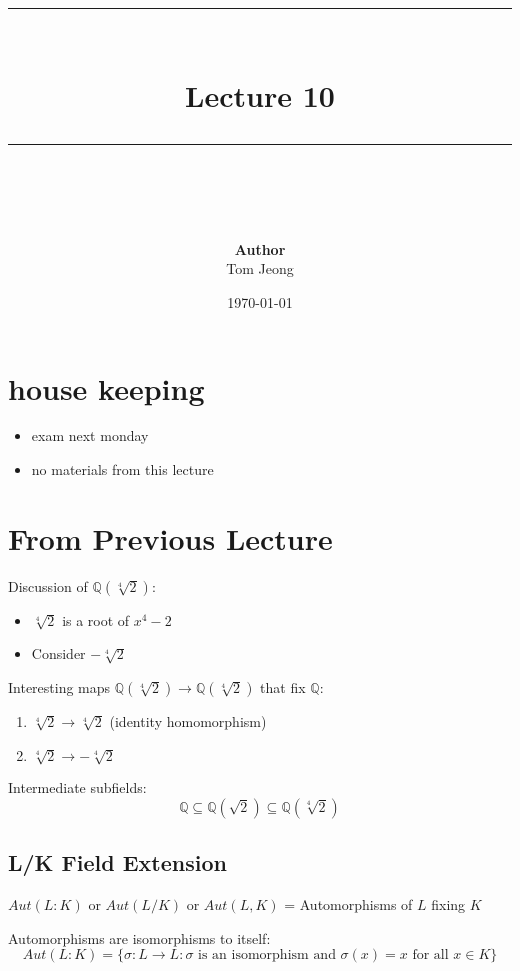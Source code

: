\documentclass{article}
\newcommand{\HRule}[1]{\rule{\linewidth}{#1}}
\begin{document}
\title{
    \normalsize
    \vspace{2.0cm}
    \HRule{1.5pt} \\[0.4cm]
    \LARGE \textbf{Lecture 10}
    \HRule{2.0pt} \\[0.6cm]
}
\author{
    \textbf{Author} \\
    Tom Jeong
}
\date{\today}

\maketitle
\tableofcontents
\newpage

\section{house keeping}
\begin{itemize}
    \item exam next monday
    \item no materials from this lecture
\end{itemize}
\section{From Previous Lecture}
Discussion of $\mathbb{Q}(\sqrt[4]{2})$:
\begin{itemize}
    \item $\sqrt[4]{2}$ is a root of $x^4 - 2$
    \item Consider $-\sqrt[4]{2}$
\end{itemize}

Interesting maps $\mathbb{Q}(\sqrt[4]{2}) \to \mathbb{Q}(\sqrt[4]{2})$ that fix $\mathbb{Q}$:
\begin{enumerate}
    \item $\sqrt[4]{2} \to \sqrt[4]{2}$ (identity homomorphism)
    \item $\sqrt[4]{2} \to -\sqrt[4]{2}$
\end{enumerate}

Intermediate subfields:
$$\mathbb{Q} \subseteq \mathbb{Q}(\sqrt{2}) \subseteq \mathbb{Q}(\sqrt[4]{2})$$

\subsection{L/K Field Extension}
$Aut(L:K)$ or $Aut(L/K)$ or $Aut(L,K)$ = Automorphisms of $L$ fixing $K$

\begin{definition}
    Automorphisms are isomorphisms to itself:
    $$Aut(L:K) = \{\sigma: L \to L: \sigma \text{ is an isomorphism} \text{ and } \sigma(x) = x \text{ for all } x \in K \}$$
\end{definition}
\end{document}

